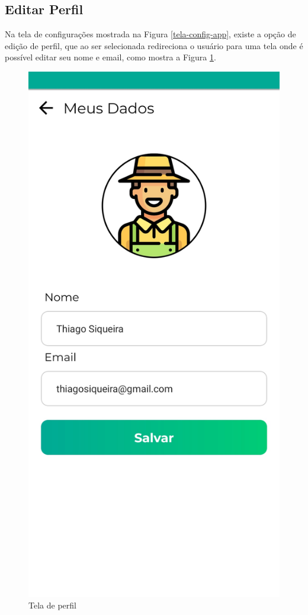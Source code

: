 \subsection{Editar Perfil}
Na tela de configurações mostrada na Figura \ref{tela-config-app}, existe a opção de edição de perfil, que ao ser selecionada redireciona o usuário para uma tela onde é possível editar seu nome e email, como mostra a Figura \ref{tela-perfil-app}.

\begin{figure}[h]
	\centering
	\includegraphics[keepaspectratio=true,scale=0.16]{figuras/tela_perfil.jpg}
	\caption{Tela de perfil}
        \label{tela-perfil-app}
\end{figure}

